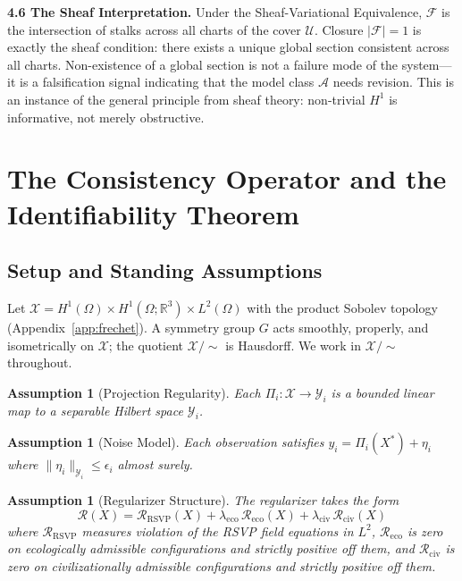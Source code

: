 \documentclass[12pt, oneside]{article}
\newtheorem{assumption}[theorem]{Assumption}
\newcommand{\Xmod}{\mathcal{X}/{\sim}}
\begin{document}
{\medskip
\textbf{4.6 The Sheaf Interpretation.}
Under the Sheaf-Variational Equivalence, $\mathcal{F}$ is the intersection of stalks
across all charts of the cover $\mathcal{U}$. Closure $|\mathcal{F}| = 1$ is exactly the
sheaf condition: there exists a unique global section consistent across all charts.
Non-existence of a global section is not a failure mode of the system---it is a
falsification signal indicating that the model class $\mathcal{A}$ needs revision. This
is an instance of the general principle from sheaf theory: non-trivial $H^1$ is
informative, not merely obstructive.
}

\section{The Consistency Operator and the Identifiability Theorem}
\label{sec:identifiability}

\subsection{Setup and Standing Assumptions}

Let $\mathcal{X} = H^1(\Omega) \times H^1(\Omega;\mathbb{R}^3) \times L^2(\Omega)$
with the product Sobolev topology (Appendix~\ref{app:frechet}). A symmetry group $G$
acts smoothly, properly, and isometrically on $\mathcal{X}$; the quotient $\Xmod$ is
Hausdorff. We work in $\Xmod$ throughout.

\begin{assumption}[Projection Regularity]
\label{ass:regularity}
Each $\Pi_i : \mathcal{X} \to \mathcal{Y}_i$ is a bounded linear map to a separable
Hilbert space $\mathcal{Y}_i$.
\end{assumption}

\begin{assumption}[Noise Model]
\label{ass:noise}
Each observation satisfies $y_i = \Pi_i(X^*) + \eta_i$ where $\|\eta_i\|_{\mathcal{Y}_i}
\le \epsilon_i$ almost surely.
\end{assumption}

\begin{assumption}[Regularizer Structure]
\label{ass:regularizer}
The regularizer takes the form
\[
\mathcal{R}(X) = \mathcal{R}_{\mathrm{RSVP}}(X)
+ \lambda_{\mathrm{eco}}\,\mathcal{R}_{\mathrm{eco}}(X)
+ \lambda_{\mathrm{civ}}\,\mathcal{R}_{\mathrm{civ}}(X)
\]
where $\mathcal{R}_{\mathrm{RSVP}}$ measures violation of the RSVP field equations in
$L^2$, $\mathcal{R}_{\mathrm{eco}}$ is zero on ecologically admissible configurations
and strictly positive off them, and $\mathcal{R}_{\mathrm{civ}}$ is zero on
civilizationally admissible configurations and strictly positive off them.
\end{assumption}
\end{document}
